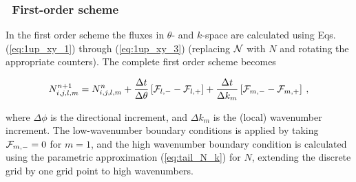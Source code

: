 \vssub
\subsubsection{~First-order scheme}

\noindent
In the first order scheme the fluxes in $\theta$- and $k$-space are calculated
using Eqs. (\ref{eq:1up_xy_1}) through (\ref{eq:1up_xy_3}) (replacing ${\cal N}$ with
$N$ and rotating the appropriate counters). The complete first order scheme
becomes


\begin{equation}
N_{i,j,l,m}^{n+1} = N_{i,j,l,m}^n 
 + \frac{\Delta t}{\Delta \theta} \left [ \cF_{l,-} - \cF_{l,+} \right ]
 + \frac{\Delta t}{\Delta k_m} \left [ \cF_{m,-} - \cF_{m,+} \right ]
\: , \label{eq:1up_intra_tot} \end{equation}

\noindent
where $\Delta \phi$ is the directional increment, and $\Delta k_m$ is the
(local) wavenumber increment. The low-wavenumber boundary conditions is
applied by taking ${\cal F}_{m,-}=0$ for $m=1$, and the high wavenumber boundary
condition is calculated using the parametric approximation (\ref{eq:tail_N_k})
for $N$, extending the discrete grid by one grid point to high wavenumbers.